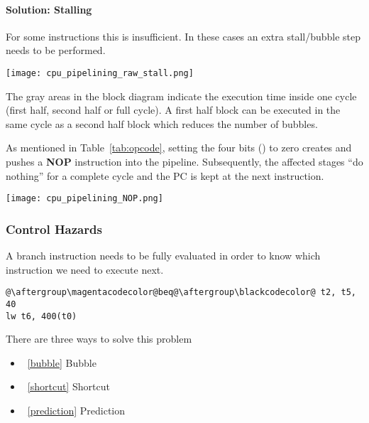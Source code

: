 \begin{multicols*}{2}
\begin{footnotesize}
        \renewcommand{\arraystretch}{1}
        \setlength{\tabcolsep}{\oldtabcolsep}
    \end{footnotesize}

    \paragraph{Solution: Stalling}
    For some instructions this is insufficient. In these cases an extra stall/bubble step needs to be performed.

    \texttt{[image: cpu\_pipelining\_raw\_stall.png]}

    The gray areas in the block diagram indicate the execution time inside one cycle (first half, second half or full cycle). A first half block can be executed in the same cycle as a second half block which reduces the number of bubbles.

    \newpar{}
    As mentioned in Table~\ref{tab:opcode}, setting the four bits () to zero creates and pushes a \textbf{NOP} instruction into the pipeline.
    Subsequently, the affected stages ``do nothing'' for a complete cycle and the PC is kept at the next instruction.
    \begin{center}
        \texttt{[image: cpu\_pipelining\_NOP.png]}
    \end{center}

    \subsubsection{Control Hazards}\label{control hazards}

    A branch instruction needs to be fully evaluated in order to know which instruction we need to execute next.

    \begin{lstlisting}[escapechar=@]
@\aftergroup\magentacodecolor@beq@\aftergroup\blackcodecolor@ t2, t5, 40
lw t6, 400(t0)
\end{lstlisting}

    There are three ways to solve this problem
    \begin{itemize}
        \item~\ref{bubble} Bubble
        \item~\ref{shortcut} Shortcut
        \item~\ref{prediction} Prediction
    \end{itemize}


\end{multicols*}
